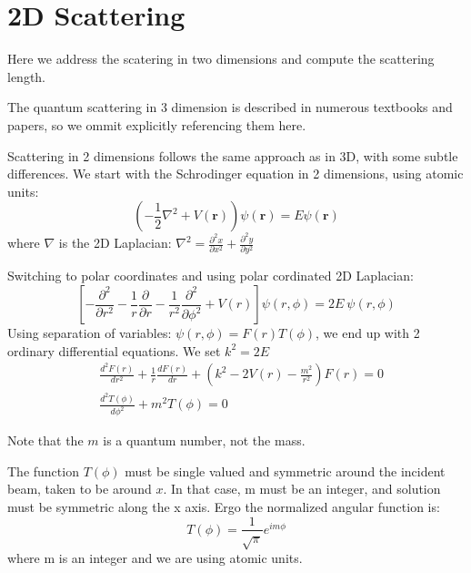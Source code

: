 \chapter{2D Scattering}

  Here we address the scatering in two dimensions and compute the scattering length.

  The quantum scattering in 3 dimension is described in numerous textbooks and papers, so we ommit explicitly referencing them here.

  Scattering in 2 dimensions follows the same approach as in 3D, with some subtle differences.
  We start with the Schrodinger equation in 2 dimensions, using atomic units:
  \begin{equation}\label{2DS1}
      \left(-\frac{1}{2}\nabla^2 + V(\mathbf{r})\right)\psi(\mathbf{r}) = E\psi(\mathbf{r})
  \end{equation}
  where $ \nabla $ is the 2D Laplacian: $ \nabla^2 = \frac{\partial^2 x}{\partial x^2} + \frac{\partial^2 y}{\partial y^2} $

  Switching to polar coordinates and using polar cordinated 2D Laplacian:
  \begin{equation}
      \left[-\frac{\partial^2}{\partial r^2} - \frac{1}{r}\frac{\partial}{\partial r} - \frac{1}{r^2}\frac{\partial^2}{\partial\phi^2} + V(r)\right]\psi(r,\phi) = 2E\ \psi(r,\phi)
  \end{equation}
  Using separation of variables: $ \psi(r,\phi) = F(r)T(\phi) $, we end up with 2 ordinary differential equations. We set $ k^2 = 2E $
  \begin{equation}
  \begin{split}
   & \frac{d^2F(r)}{d r^2} +\frac{1}{r}\frac{d F(r)}{d r} +(k^2 -  2V(r) - \frac{m^2}{r^2})F(r) = 0\\[.8em]
   & \frac{d^2 T(\phi)}{d \phi^2} + m^2 T(\phi) = 0
  \end{split}
  \end{equation}

  Note that the $ m $ is a quantum number, not the mass. 

  The function $ T(\phi) $ must be single valued and symmetric around the incident beam, taken to be around $ x $. In that case, m must be an integer, and solution must be symmetric along the x axis. Ergo the normalized angular function is:
  \begin{equation}
T(\phi) = \frac{1}{\sqrt{\pi}}e^{i m\phi}
\end{equation}
where m is an integer and we are using atomic units.

